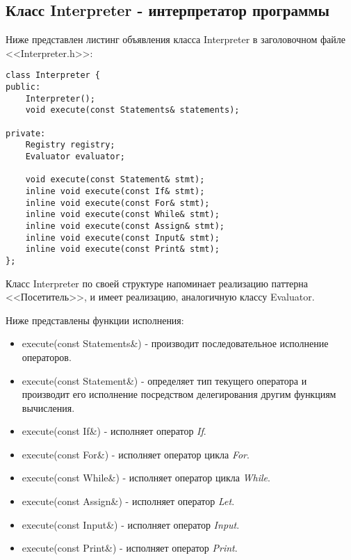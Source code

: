 \subsection{Класс Interpreter - интерпретатор программы}

Ниже представлен листинг объявления класса Interpreter
в заголовочном файле <<Interpreter.h>>:

\begin{verbatim}
class Interpreter {
public:
    Interpreter();
    void execute(const Statements& statements);

private:
    Registry registry;
    Evaluator evaluator;

    void execute(const Statement& stmt);
    inline void execute(const If& stmt);
    inline void execute(const For& stmt);
    inline void execute(const While& stmt);
    inline void execute(const Assign& stmt);
    inline void execute(const Input& stmt);
    inline void execute(const Print& stmt);
};
\end{verbatim}

Класс Interpreter по своей структуре напоминает
реализацию паттерна <<Посетитель>>,
и имеет реализацию, аналогичную классу Evaluator.

Ниже представлены функции исполнения:
\begin{itemize}
    \item execute(const Statements\&) - производит
          последовательное исполнение операторов.

    \item execute(const Statement\&) -
          определяет тип текущего оператора и производит 
          его исполнение посредством делегирования
          другим функциям вычисления.

    \item execute(const If\&) -
          исполняет оператор \emph{If}.

    \item execute(const For\&) - 
          исполняет оператор цикла \emph{For}.

    \item execute(const While\&) -
          исполняет оператор цикла \emph{While}.

    \item execute(const Assign\&) - 
          исполняет оператор \emph{Let}.

    \item execute(const Input\&) -
          исполняет оператор \emph{Input}.

    \item execute(const Print\&) - 
          исполняет оператор \emph{Print}.
\end{itemize}